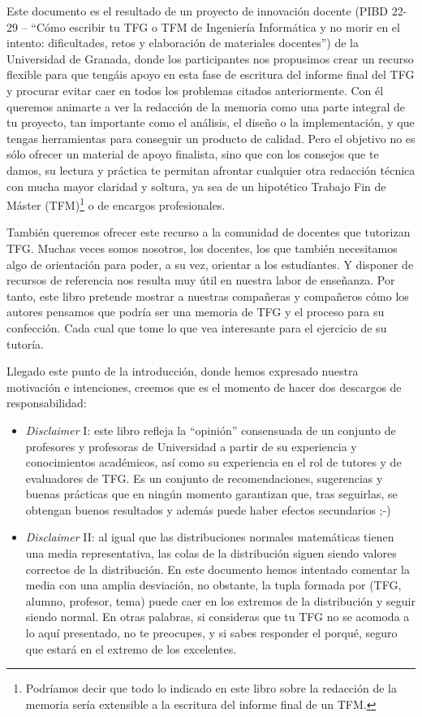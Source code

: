 Este documento es el resultado de un proyecto de innovación docente (PIBD 22-29 -- ``Cómo escribir tu TFG o TFM de Ingeniería Informática y no morir en el intento: dificultades, retos y elaboración de materiales docentes'') de la Universidad de Granada, donde los participantes nos propusimos crear un recurso flexible para que tengáis apoyo en esta fase de escritura del informe final del TFG y procurar evitar caer en todos los problemas citados anteriormente. Con él queremos animarte a ver la redacción de la memoria como una parte integral de tu proyecto, tan importante como el análisis, el diseño o la implementación, y que tengas herramientas para conseguir un producto de calidad. Pero el objetivo no es sólo ofrecer un material de apoyo finalista, sino que con los consejos que te damos, su lectura y práctica te permitan afrontar cualquier otra redacción técnica con mucha mayor claridad y soltura, ya sea de un hipotético Trabajo Fin de Máster (TFM)\footnote{Podríamos decir que todo lo indicado en este libro sobre la redacción de la memoria sería extensible a la escritura del informe final de un TFM.} o de encargos profesionales.

También queremos ofrecer este recurso a la comunidad de docentes que tutorizan TFG. Muchas veces somos nosotros, los docentes, los que también necesitamos algo de orientación para poder, a su vez, orientar a los estudiantes. Y disponer de recursos de referencia nos resulta muy útil en nuestra labor de enseñanza. Por tanto, este libro pretende mostrar a nuestras compañeras y compañeros cómo los autores pensamos que podría ser una memoria de TFG y el proceso para su confección. Cada cual que tome lo que vea interesante para el ejercicio de su tutoría.

Llegado este punto de la introducción, donde hemos expresado nuestra motivación e intenciones, creemos que es el momento de hacer dos descargos de responsabilidad:

\begin{itemize}
    \item \textit{Disclaimer} I: este libro refleja la ``opinión'' consensuada de un conjunto de profesores y profesoras de Universidad a partir de su experiencia y conocimientos académicos, así como su experiencia en el rol de tutores y de evaluadores de TFG. Es un conjunto de recomendaciones, sugerencias y buenas prácticas que en ningún momento garantizan que, tras seguirlas, se obtengan buenos resultados y además puede haber efectos secundarios ;-) 

    \item \textit{Disclaimer} II: al igual que las distribuciones normales matemáticas tienen una media representativa, las colas de la distribución siguen siendo valores correctos de la distribución. En este documento hemos intentado comentar la media con una amplia desviación, no obstante, la tupla formada por (TFG, alumno, profesor, tema) puede caer en los extremos de la distribución y seguir siendo normal. En otras palabras, si consideras que tu TFG no se acomoda a lo aquí presentado, no te preocupes, y si sabes responder el porqué, seguro que estará en el extremo de los excelentes. 
    
\end{itemize}

